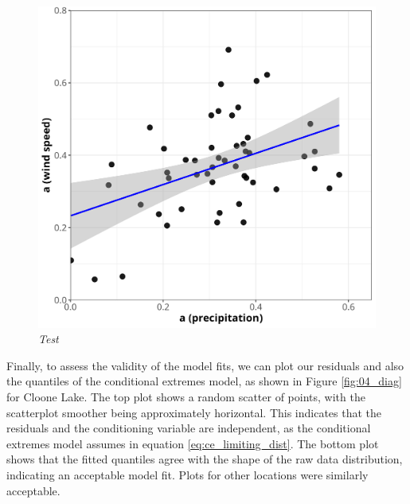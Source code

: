 \documentclass{article}
\numberwithin{equation}{section}
\begin{document}
\begin{figure}[H]
    \centering
    \includegraphics[width = 0.9\linewidth]{plots/046_alpha_rain_vs_ws.png}
    \caption{\emph{Test}}
    \label{fig:04_alpha_rain_vs_ws}
\end{figure}


Finally, to assess the validity of the model fits, we can plot our residuals and also the quantiles of the conditional extremes model, as shown in Figure \ref{fig:04_diag} for Cloone Lake.
The top plot shows a random scatter of points, with the scatterplot smoother being approximately horizontal. 
This indicates that the residuals and the conditioning variable are independent, as the conditional extremes model assumes in equation \eqref{eq:ce_limiting_dist}.
The bottom plot shows that the fitted quantiles agree with the shape of the raw data distribution, indicating an acceptable model fit.
Plots for other locations were similarly acceptable. 
\end{document}
